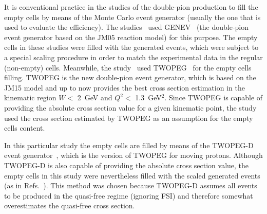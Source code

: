 It is conventional practice in the studies of the double-pion production to fill the empty cells by means of the Monte Carlo event generator (usually the one that is used to evaluate the efficiency). The studies~\cite{Rip_an_note:2002,Ripani:2002ss,Fed_an_note:2007,Fedotov:2008aa,Isupov:2017lnd,Arjun} used GENEV~\cite{Genev} (the double-pion event generator based on the JM05 reaction model) for this purpose. The empty cells in these studies were filled with the generated events, which were subject to a special scaling procedure in order to match the experimental data in the regular (non-empty) cells. Meanwhile, the study~\cite{Fed_an_note:2017,Fed_paper_2018} used TWOPEG~\cite{twopeg} for the empty cells filling. TWOPEG is the new double-pion event generator, which is based on the JM15 model and up to now provides the best cross section estimation in the kinematic region $W<$ 2~GeV and $Q^2<$ 1.3~GeV$^{2}$. Since TWOPEG is capable of providing the absolute cross section value for a given kinematic point, the study~\cite{Fed_an_note:2017,Fed_paper_2018} used the cross section estimated by TWOPEG as an assumption for the empty cells content. 

In this particular study the empty cells are filled by means of the TWOPEG-D event generator~\cite{twopeg-d}, which is the version of TWOPEG for moving protons.  Although TWOPEG-D is also capable of providing the absolute cross section value, the empty cells in this study were nevertheless filled with the scaled generated events (as in Refs.~\cite{Rip_an_note:2002,Ripani:2002ss,Fed_an_note:2007,Fedotov:2008aa,Isupov:2017lnd,Arjun}). This method was chosen because TWOPEG-D assumes all events to be produced in the quasi-free regime (ignoring FSI) and therefore somewhat overestimates the quasi-free cross section.


